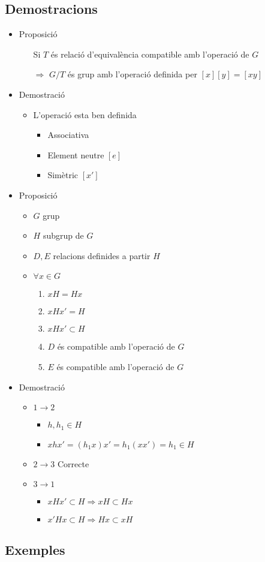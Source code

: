 \subsection*{Demostracions}
\begin{itemize}
\item Proposició
	\begin{itemize}
	\item[Si] $T$ és relació d'equivalència compatible amb l'operació de $G$
	\item[$\Rightarrow$] $G/T$ és grup amb l'operació definida per
		\subitem $[x][y] = [xy]$
	\end{itemize}
\item Demostració
	\begin{itemize}
	\item L'operació esta ben definida
		\begin{itemize}
		\item Associativa
		\item Element neutre $[e]$
		\item Simètric $[x']$
		\end{itemize}
	\end{itemize}
\item Proposició
	\begin{itemize}
	\item $G$ grup
	\item $H$ subgrup de $G$
	\item $D, E$ relacions definides a partir $H$
	\item $\forall x \in G$
		\begin{enumerate}
		\item $xH = Hx$
		\item $xHx' = H$
		\item $xHx' \subset H$
		\item $D$ és compatible amb l'operació de $G$
		\item $E$ és compatible amb l'operació de $G$
		\end{enumerate}
	\end{itemize}
\item Demostració
	\begin{itemize}
	\item $1 \to 2$
		\begin{itemize}
		\item $h, h_1 \in H$
		\item $xhx' = (h_1x)x' = h_1 (xx') = h_1 \in H$
		\end{itemize}
	\item $2 \to 3$ Correcte
	\item $3 \to 1$
		\begin{itemize}
		\item $xHx' \subset H \Rightarrow xH \subset Hx$
		\item $x'Hx \subset H \Rightarrow Hx \subset xH$
		\end{itemize}
	\end{itemize}
\end{itemize}
\subsection*{Exemples}
